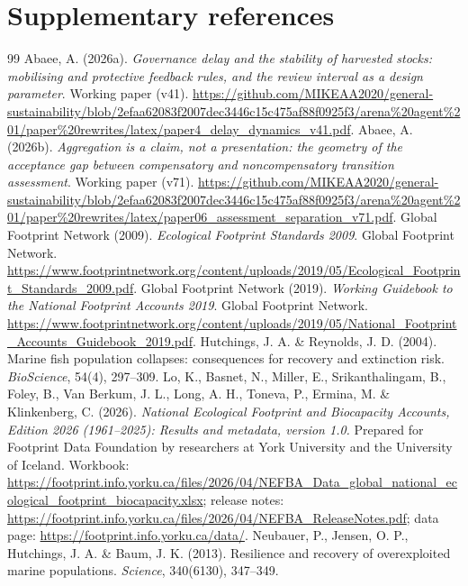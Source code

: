 \documentclass[11pt,a4paper]{article}
\begin{document}
\section*{Supplementary references}
\begin{thebibliography}{99}
\small
{} Abaee, A. (2026a). \emph{Governance delay and the stability of harvested stocks: mobilising and protective feedback rules, and the review interval as a design parameter}. Working paper (v41). \url{https://github.com/MIKEAA2020/general-sustainability/blob/2efaa62083f2007dec3446c15c475af88f0925f3/arena%20agent%201/paper%20rewrites/latex/paper4_delay_dynamics_v41.pdf}.
 Abaee, A. (2026b). \emph{Aggregation is a claim, not a presentation: the geometry of the acceptance gap between compensatory and noncompensatory transition assessment}. Working paper (v71). \url{https://github.com/MIKEAA2020/general-sustainability/blob/2efaa62083f2007dec3446c15c475af88f0925f3/arena%20agent%201/paper%20rewrites/latex/paper06_assessment_separation_v71.pdf}.
 Global Footprint Network (2009). \emph{Ecological Footprint Standards 2009}. Global Footprint Network. \url{https://www.footprintnetwork.org/content/uploads/2019/05/Ecological_Footprint_Standards_2009.pdf}.
 Global Footprint Network (2019). \emph{Working Guidebook to the National Footprint Accounts 2019}. Global Footprint Network. \url{https://www.footprintnetwork.org/content/uploads/2019/05/National_Footprint_Accounts_Guidebook_2019.pdf}.
 Hutchings, J. A. \& Reynolds, J. D. (2004). Marine fish population collapses: consequences for recovery and extinction risk. \emph{BioScience}, 54(4), 297--309.
 Lo, K., Basnet, N., Miller, E., Srikanthalingam, B., Foley, B., Van Berkum, J. L., Long, A. H., Toneva, P., Ermina, M. \& Klinkenberg, C. (2026). \emph{National Ecological Footprint and Biocapacity Accounts, Edition 2026 (1961--2025): Results and metadata, version 1.0.} Prepared for Footprint Data Foundation by researchers at York University and the University of Iceland. Workbook: \url{https://footprint.info.yorku.ca/files/2026/04/NEFBA_Data_global_national_ecological_footprint_biocapacity.xlsx}; release notes: \url{https://footprint.info.yorku.ca/files/2026/04/NEFBA_ReleaseNotes.pdf}; data page: \url{https://footprint.info.yorku.ca/data/}.
 Neubauer, P., Jensen, O. P., Hutchings, J. A. \& Baum, J. K. (2013). Resilience and recovery of overexploited marine populations. \emph{Science}, 340(6130), 347--349.

\end{thebibliography}
\end{document}
